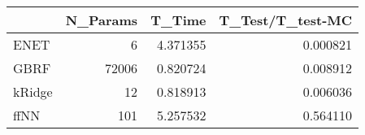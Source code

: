 \begin{tabular}{lrrr}
\toprule
{} &  N\_Params &    T\_Time &  T\_Test/T\_test-MC \\
\midrule
ENET   &         6 &  4.371355 &          0.000821 \\
GBRF   &     72006 &  0.820724 &          0.008912 \\
kRidge &        12 &  0.818913 &          0.006036 \\
ffNN   &       101 &  5.257532 &          0.564110 \\
\bottomrule
\end{tabular}
